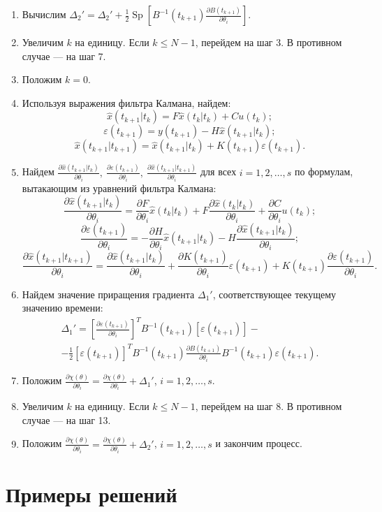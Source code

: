 \documentclass[a4paper,14pt]{extarticle}
\DeclareMathOperator{\Sp}{Sp}
\newcommand{\pred}[0]{t_{k+1}|t_k}
\newcommand{\est}[0]{t_k|t_k}
\newcommand{\fut}[0]{t_{k+1}}
\newcommand{\estfut}[0]{t_{k+1}|t_{k+1}}
\newcommand{\pd}[2]{\frac{\partial #1}{\partial #2}}
\newcommand{\pdpk}[1]{\pd{#1}{\theta_i}}
\newcommand{\inv}[1]{#1^{-1}}
\newcommand{\eps}{\varepsilon}
\begin{document}
\begin{enumerate}
\item Вычислим $\Delta_2' = \Delta_2' + \frac{1}{2} \Sp \left[ \inv{B}(\fut)
\pdpk{B(\fut)} \right].$

\item Увеличим $k$ на единицу. Если $k \le N-1$, перейдем на шаг 3. В противном
случае --- на шаг 7.

\item Положим $k = 0$.

\item Используя выражения фильтра Калмана, найдем:
\[
	\hat{x}(\pred) = F \hat{x}(\est) + C u(t_k);
\]
\[
	\eps(\fut) = y(\fut) - H \hat{x}(\pred);
\]
\[
	\hat{x}(\estfut) = \hat{x}(\pred) + K(\fut) \eps(\fut).
\]

\item Найдем $\pdpk{\hat{x}(\pred)},\ \pdpk{\eps(\fut)},\
\pdpk{\hat{x}(\estfut)}$ для всех $i = 1, 2, \ldots, s$ по формулам, вытакающим
из уравнений фильтра Калмана:
\[
	\pdpk{\hat{x}(\pred)} = \pdpk{F} \hat{x}(\est) + F \pdpk{\hat{x}(\est)} +
	\pdpk{C} u(t_k);
\]
\[
	\pdpk{\eps(\fut)} = -\pdpk{H} \hat{x}(\pred) - H \pdpk{\hat{x}(\pred)};
\]
\[
	\pdpk{\hat{x}(\estfut)} = \pdpk{\hat{x}(\pred)} + \pdpk{K(\fut)} \eps(\fut) +
	K(\fut) \pdpk{\eps(\fut)}.
\]

\item Найдем значение приращения градиента $\Delta_1'$, соответствующее
текущему значению времени:
\begin{equation*}
\begin{split}
	\Delta_1' = \left[ \pdpk{\eps(\fut)} \right]^T \inv{B}(\fut)
	\left[ \eps(\fut) \right] - \\ - \frac{1}{2} \left[ \eps(\fut) \right]^T
	\inv{B}(\fut) \pdpk{B(\fut)} \inv{B}(\fut) \eps(\fut).
\end{split}
\end{equation*}

\item Положим $\pdpk{\chi(\theta)} = \pdpk{\chi(\theta)} + \Delta_1'$,
$i = 1, 2, \ldots, s$.

\item Увеличим $k$ на единицу. Если $k \le N-1$, перейдем на шаг 8.
В противном случае --- на шаг 13.

\item Положим $\pdpk{\chi(\theta)} = \pdpk{\chi(\theta)} + \Delta_2'$,
$i = 1, 2, \ldots, s$ и закончим процесс.

\end{enumerate}

\section{Примеры решений}
\end{document}
